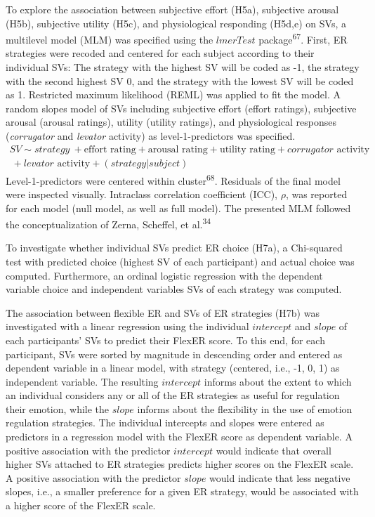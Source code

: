 \documentclass[
  man,floatsintext]{apa6}
\begin{document}
To explore the association between subjective effort (H5a), subjective arousal (H5b), subjective utility (H5c), and physiological responding (H5d,e) on SVs, a multilevel model (MLM) was specified using the \(lmerTest\) package\textsuperscript{67}.
First, ER strategies were recoded and centered for each subject according to their individual SVs: The strategy with the highest SV will be coded as -1, the strategy with the second highest SV 0, and the strategy with the lowest SV will be coded as 1.
Restricted maximum likelihood (REML) was applied to fit the model.
A random slopes model of SVs including subjective effort (effort ratings), subjective arousal (arousal ratings), utility (utility ratings), and physiological responses (\emph{corrugator} and \emph{levator} activity) as level-1-predictors was specified.
\[
\begin{split}
SV \sim strategy\ + \text{effort rating} + \text{arousal rating} + \text{utility rating} + corrugator \text{ activity} \\\ + levator \text{ activity} + (strategy|subject)
\end{split}
\]
Level-1-predictors were centered within cluster\textsuperscript{68}.
Residuals of the final model were inspected visually.
Intraclass correlation coefficient (ICC), \(\rho\), was reported for each model (null model, as well as full model).
The presented MLM followed the conceptualization of Zerna, Scheffel, et al.\textsuperscript{34}

To investigate whether individual SVs predict ER choice (H7a), a Chi-squared test with predicted choice (highest SV of each participant) and actual choice was computed.
Furthermore, an ordinal logistic regression with the dependent variable choice and independent variables SVs of each strategy was computed.

The association between flexible ER and SVs of ER strategies (H7b) was investigated with a linear regression using the individual \(intercept\) and \(slope\) of each participants' SVs to predict their FlexER score.
To this end, for each participant, SVs were sorted by magnitude in descending order and entered as dependent variable in a linear model, with strategy (centered, i.e., -1, 0, 1) as independent variable.
The resulting \(intercept\) informs about the extent to which an individual considers any or all of the ER strategies as useful for regulation their emotion, while the \(slope\) informs about the flexibility in the use of emotion regulation strategies.
The individual intercepts and slopes were entered as predictors in a regression model with the FlexER score as dependent variable.
A positive association with the predictor \(intercept\) would indicate that overall higher SVs attached to ER strategies predicts higher scores on the FlexER scale.
A positive association with the predictor \(slope\) would indicate that less negative slopes, i.e., a smaller preference for a given ER strategy, would be associated with a higher score of the FlexER scale.
\end{document}
